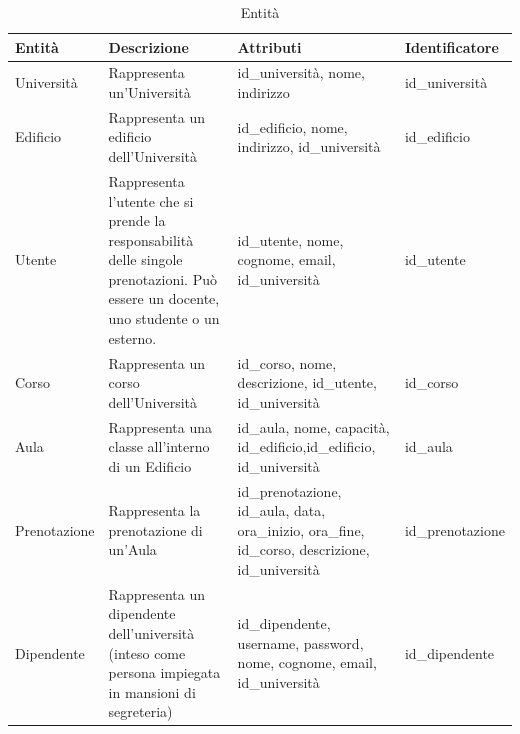 \documentclass[a4paper, 10pt, oneside]{article} %
\begin{document}
\begin{table}[H]
\begin{tabular}{m{2.25cm} | m{6cm}| m{3.5cm} | m{1.5cm} }

\textbf{Entità} & \textbf{Descrizione} & \textbf{Attributi} & \textbf{Identificatore}\\

\hline

Università  & Rappresenta un'Università& id\_università, nome, indirizzo & id\_università\\

\hline

Edificio   & Rappresenta un edificio dell'Università & id\_edificio, nome, indirizzo, id\_università & id\_edificio\\

\hline

Utente & Rappresenta l'utente che si prende la responsabilità delle singole prenotazioni. Può essere un docente, uno studente o un esterno.& id\_utente, nome, cognome, email, id\_università & id\_utente \\

\hline

Corso & Rappresenta un corso dell'Università & id\_corso, nome, descrizione, id\_utente, id\_università & id\_corso\\

\hline

Aula & Rappresenta una classe all'interno di un Edificio & id\_aula, nome, capacità, id\_edificio,id\_edificio, id\_università & id\_aula \\

\hline

Prenotazione & Rappresenta la prenotazione di un'Aula & id\_prenotazione, id\_aula, data, ora\_inizio, ora\_fine, id\_corso, descrizione, id\_università & id\_prenotazione\\

\hline

Dipendente & Rappresenta un dipendente dell'università (inteso come persona impiegata in mansioni di segreteria) & id\_dipendente, username, password, nome, cognome, email, id\_università & id\_dipendente\\

\end{tabular}
\caption{Entità}
\end{table}
\newpage
\end{document}
